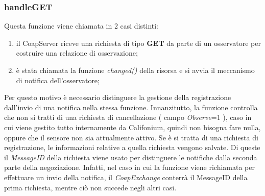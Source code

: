 			\subsubsection{handleGET}
				Questa funzione viene chiamata in 2 casi distinti:
				\begin{enumerate}
					\item il CoapServer riceve una richiesta di tipo \textbf{GET} da parte di un osservatore per costruire una relazione di osservazione;
					\item è stata chiamata la funzione \textit{changed()} della risorsa e si avvia il meccanismo di notifica dell'osservatore;
				\end{enumerate}
				Per questo motivo è necessario distinguere la gestione della registrazione dall'invio di una notifica nella stessa funzione. \newline
				Innanzitutto, la funzione controlla che non si tratti di una richiesta di cancellazione ( campo \textit{Observe}=1 ), caso in cui viene gestito tutto internamente da Califonium, quindi non bisogna fare nulla, oppure che il sensore non sia attualmente attivo. \newline
				Se è si tratta di una richiesta di registrazione, le informazioni relative a quella richiesta vengono salvate. Di queste il \textit{MessageID} della richiesta viene usato per distinguere le notifiche dalla seconda parte della negoziazione. Infatti, nel caso in cui la funzione viene richiamata per effettuare un invio della notifica, il \textit{CoapExchange} conterrà il MessageID della prima richiesta, mentre ciò non succede negli altri casi.

